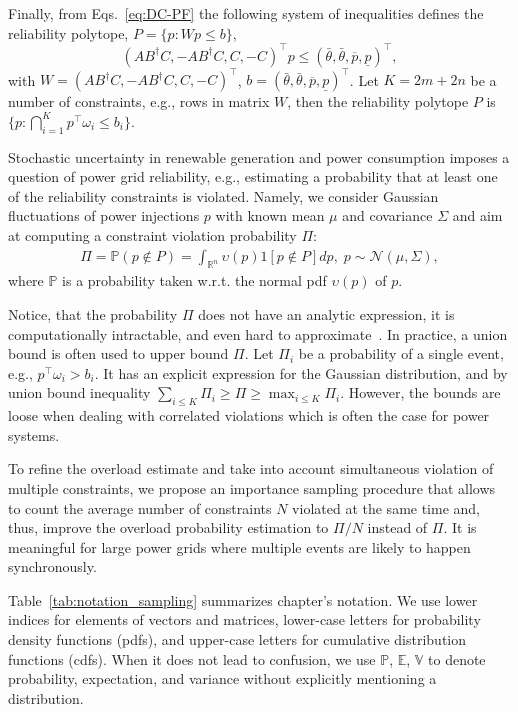 Finally, from Eqs.~\eqref{eq:DC-PF} the following system of inequalities defines the reliability polytope, $P = \{p: Wp \le b\}$,
\begin{equation}
(AB^\dagger C, - A B^\dagger C, C, -C)^\top p \le (\bar\theta, \bar\theta, \overline{p}, \underline{p})^\top, 
\label{eq:feasibility_ineqs}
\end{equation}
with $W = (AB^\dagger C, - A B^\dagger C, C, -C)^\top$, $b = (\bar\theta, \bar\theta, \overline{p}, \underline{p})^\top$\!\!\!. Let $K = 2m + 2n$ be a number of constraints, e.g., rows in matrix $W$, then the reliability polytope $P$ is $\bigl\{p\!:\! \bigcap_{i=1}^K p^\top\!\!\omega_i \le b_i\bigr\}$. 

Stochastic uncertainty in renewable generation and power consumption imposes a question of power grid reliability, e.g., estimating a probability that at least one of the reliability constraints is violated. Namely, we consider Gaussian fluctuations of power injections $p$ with known mean $\mu$ and covariance $\Sigma$ and aim at computing a constraint violation probability $\Pi$:
\begin{align}\label{eq:prob}
    \Pi = \mathbb{P}(p\not\in P) = \int_{\mathbb{R}^n} \upsilon(p) 1[p\not\in P] d p, \; p\sim \mathcal{N}(\mu, \Sigma), 
\end{align}
where $\mathbb{P}$ is a probability taken w.r.t. the normal pdf $\upsilon(p)$ of $p$. 

Notice, that the probability $\Pi$ does not have an analytic expression, it is computationally intractable, and even hard to approximate~\cite{owen2019importance,ryu2014adaptive,cappe2008adaptive, khachiyan1989problem}. 
In practice, a union bound is often used to upper bound $\Pi$. Let $\Pi_i$ be a probability of a single event, e.g., $p^\top\omega_i > b_i$. It has an explicit expression for the Gaussian distribution, and by union bound inequality
$\sum_{i\le K}\Pi_i \ge \Pi \ge \max_{i\le K} \Pi_i$. However, the bounds are loose when dealing with correlated violations which is often the case for power systems. 

To refine the overload estimate and take into account simultaneous violation of multiple constraints, we propose an importance sampling procedure that allows to count the average number of constraints $N$ violated at the same time and, thus, improve the overload probability estimation to $\Pi/N$ instead of $\Pi$. It is meaningful for large power grids where multiple events are likely to happen synchronously.

Table~\ref{tab:notation_sampling} summarizes chapter's notation. We use lower indices for elements of vectors and matrices, lower-case letters for probability density functions (pdfs), and upper-case letters for cumulative distribution functions (cdfs). When it does not lead to confusion, we use $\mathbb{P}$, $\mathbb{E}$, $\mathbb{V}$ to denote  probability, expectation, and variance without explicitly mentioning a distribution. 

